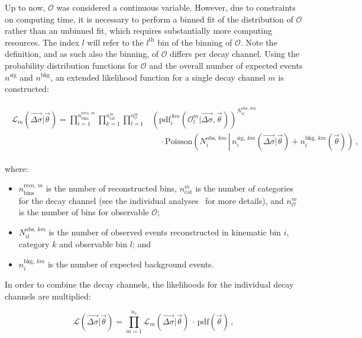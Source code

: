 Up to now, $\mathcal{O}$ was considered a continuous variable.
% 
However, due to constraints on computing time, it is necessary to perform a binned fit of the distribution of $\mathcal{O}$ rather than an unbinned fit, which requires substantially more computing resources.
% 
The index $l$ will refer to the $l^\text{th}$ bin of the binning of $\mathcal{O}$.
% 
Note the definition, and as such also the binning, of $\mathcal{O}$ differs per decay channel.
% 
Using the probability distribution functions for $\mathcal{O}$ and the overall number of expected events $n^\text{sig}$ and $n^\text{bkg}$, an extended likelihood function for a single decay channel $m$ is constructed:
% 
\begin{linenomath*}
\begin{align}
\begin{split}
\mathcal{L}_m(\vec{\Delta\sigma} | \vec{\theta}) =
    \prod_{i=1}^{n_\text{bins}^{\text{reco},\,m}}
    \prod_{k=1}^{n_\text{cat}^m}
    \prod_{l=1}^{n_\mathcal{O}^m}
        &
        \left(
        \text{pdf}_i^{\,km}(\mathcal{O}_l^m | \vec{\Delta\sigma}, \vec{\theta})
        \right)^{ N^{\text{obs},\,km}_{il} }
        \\
        & \quad \cdot
        \text{Poisson}\left(
            N^{\text{obs},\,km}_{i}
            \, \left| \,
            n_i^{\text{sig},\,km}(\vec{\Delta\sigma} | \vec{\theta})
            + n^{\text{bkg},\,km}_i(\vec{\theta})
            \right)\right.
\,,
\label{eq:L_per_decaychannel}
\end{split}
\end{align}
\end{linenomath*}
% 
where:
% 
\begin{itemize}
\item $n_\text{bins}^{\text{reco},\,m}$ is the number of reconstructed bins,
$n_\text{cat}^m$ is the number of categories for the decay channel (see the individual analyses~\cite{Sirunyan:2018kta, Sirunyan:2017exp, Sirunyan:2017dgc} for more details),
and $n_\mathcal{O}^m$ is the number of bins for observable $\mathcal{O}$;
% 
\item $N^{\text{obs},\,km}_{il}$ is the number of observed events reconstructed in kinematic bin $i$, category $k$ and observable bin $l$; and
% 
\item $n^{\text{bkg},\,km}_i$ is the number of expected background events.
\end{itemize}
% 
In order to combine the decay channels, the likelihoods for the individual decay channels are multiplied:
% 
\begin{linenomath*}
\begin{equation}
\label{eq:fulllikelihood}
\mathcal{L}(\vec{\Delta\sigma} | \vec{\theta})
= \prod_{m=1}^{n_c} \mathcal{L}_m(\vec{\Delta\sigma} | \vec{\theta})
    \,\cdot\,
    \text{pdf}(\vec{\theta})
\,,
\end{equation}
\end{linenomath*}

